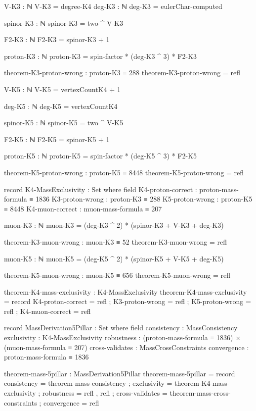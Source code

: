 \documentclass[11pt,a4paper]{book}
\begin{document}
\begin{code}
V-K3 : ℕ
V-K3 = degree-K4
deg-K3 : ℕ
deg-K3 = eulerChar-computed

spinor-K3 : ℕ
spinor-K3 = two ^ V-K3

F2-K3 : ℕ
F2-K3 = spinor-K3 + 1

proton-K3 : ℕ
proton-K3 = spin-factor * (deg-K3 ^ 3) * F2-K3

theorem-K3-proton-wrong : proton-K3 ≡ 288
theorem-K3-proton-wrong = refl

V-K5 : ℕ
V-K5 = vertexCountK4 + 1

deg-K5 : ℕ
deg-K5 = vertexCountK4

spinor-K5 : ℕ
spinor-K5 = two ^ V-K5

F2-K5 : ℕ
F2-K5 = spinor-K5 + 1

proton-K5 : ℕ
proton-K5 = spin-factor * (deg-K5 ^ 3) * F2-K5

theorem-K5-proton-wrong : proton-K5 ≡ 8448
theorem-K5-proton-wrong = refl

record K4-MassExclusivity : Set where
  field
    K4-proton-correct : proton-mass-formula ≡ 1836
    K3-proton-wrong   : proton-K3 ≡ 288
    K5-proton-wrong   : proton-K5 ≡ 8448
    K4-muon-correct   : muon-mass-formula ≡ 207

muon-K3 : ℕ
muon-K3 = (deg-K3 ^ 2) * (spinor-K3 + V-K3 + deg-K3)

theorem-K3-muon-wrong : muon-K3 ≡ 52
theorem-K3-muon-wrong = refl

muon-K5 : ℕ
muon-K5 = (deg-K5 ^ 2) * (spinor-K5 + V-K5 + deg-K5)

theorem-K5-muon-wrong : muon-K5 ≡ 656
theorem-K5-muon-wrong = refl

theorem-K4-mass-exclusivity : K4-MassExclusivity
theorem-K4-mass-exclusivity = record
  { K4-proton-correct = refl
  ; K3-proton-wrong   = refl
  ; K5-proton-wrong   = refl
  ; K4-muon-correct   = refl
  }

record MassDerivation5Pillar : Set where
  field
    consistency     : MassConsistency
    exclusivity     : K4-MassExclusivity
    robustness      : (proton-mass-formula ≡ 1836) × (muon-mass-formula ≡ 207)
    cross-validates : MassCrossConstraints
    convergence     : proton-mass-formula ≡ 1836

theorem-mass-5pillar : MassDerivation5Pillar
theorem-mass-5pillar = record
  { consistency     = theorem-mass-consistency
  ; exclusivity     = theorem-K4-mass-exclusivity
  ; robustness      = refl , refl
  ; cross-validates = theorem-mass-cross-constraints
  ; convergence     = refl
  }


\end{code}
\end{document}

